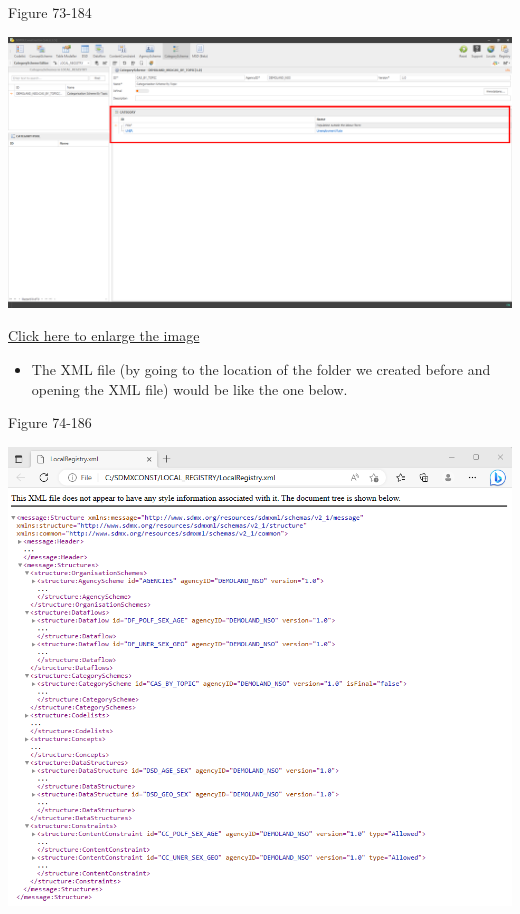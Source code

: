 \documentclass[
]{book}
\providecommand{\tightlist}{%
  \setlength{\itemsep}{0pt}\setlength{\parskip}{0pt}}
\theoremstyle{definition}
\theoremstyle{definition}
\theoremstyle{definition}
\theoremstyle{definition}
\theoremstyle{remark}
\begin{document}
Figure 73-184

\begin{center}\includegraphics[width=1\linewidth]{./images/image184} \end{center}

\href{images/image184.png}{Click here to enlarge the image}

\begin{itemize}
\tightlist
\item
  The XML file (by going to the location of the folder we created before and opening the XML file) would be like the one below.
\end{itemize}

Figure 74-186

\begin{center}\includegraphics[width=1\linewidth]{./images/image186} \end{center}
\end{document}
